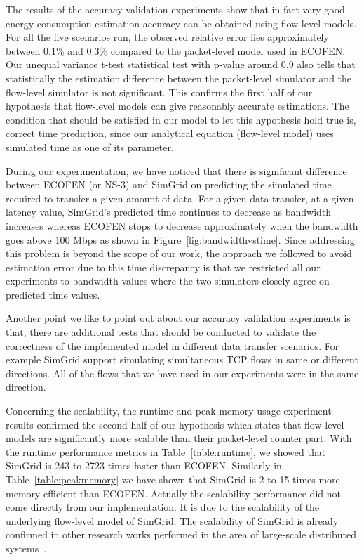 The results of the accuracy validation experiments show that in fact very good energy consumption estimation accuracy can be obtained using flow-level models. For all the five scenarios run, the observed relative error lies approximately between  0.1\% and 0.3\% compared to the packet-level model used in ECOFEN. Our unequal variance t-test statistical test with p-value around 0.9 also tells that statistically the estimation difference between the packet-level simulator and the flow-level simulator is not significant. This confirms the first half of our hypothesis that flow-level models can give reasonably accurate estimations. The condition that should be satisfied in our model to let this hypothesis hold true is, correct time prediction, since our analytical equation (flow-level model) uses simulated time as one of its parameter. 

During our experimentation, we have noticed that there is significant difference between ECOFEN (or NS-3) and SimGrid on predicting the simulated time required to transfer a given amount of data. For a given data transfer, at a given latency value, SimGrid's predicted time continues to decrease as bandwidth increases whereas ECOFEN stops to decrease approximately when the bandwidth goes above 100 Mbps as shown in Figure~\ref{fig:bandwidthvstime}. Since addressing this problem is beyond the scope of our work, the approach we followed to avoid estimation error due to this time discrepancy is that we restricted all our experiments to bandwidth values where the two simulators closely agree on predicted time values.

Another point we like to point out about our accuracy validation experiments is that, there are additional tests that should be conducted to validate the correctness of the implemented model in different data transfer scenarios. For example SimGrid support simulating simultaneous TCP flows in same or different directions. All of the flows that we have used in our experiments were in the same direction. 

Concerning the scalability, the runtime and peak memory usage experiment results confirmed the second half of our hypothesis which states that flow-level models are significantly more scalable than their packet-level counter part. With the runtime performance metrics in Table~\ref{table:runtime}, we showed that SimGrid is 243 to 2723 times faster than ECOFEN. Similarly in Table~\ref{table:peakmemory} we have shown that SimGrid is 2 to 15 times more memory efficient than ECOFEN. Actually the scalability performance did not come directly from our implementation. It is due to the scalability of the underlying flow-level model of SimGrid. The scalability of SimGrid is already confirmed in other research works performed in the area of large-scale distributed systems~\cite{DBLP:conf/ccgrid/QuinsonRT12,DBLP:journals/jpdc/CasanovaGLQS14}.

